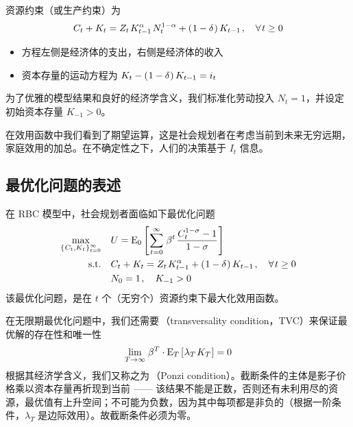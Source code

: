 
资源约束（或生产约束）为
\begin{align}
    C_t+K_t=Z_t\,K\lt^\alpha\,N_t^{1-\alpha}+\bka{1-\delta}K_{t-1}\,, \quad \forall\,t\geq 0
\end{align}
\begin{itemize}
    \item 方程左侧是经济体的支出，右侧是经济体的收入
    \item 资本存量的运动方程为 \(K_t-\left(\mspace{1mu}1-\delta\mspace{1mu}\right)K_{t-1}=i_t\)
\end{itemize}


为了优雅的模型结果和良好的经济学含义，我们标准化劳动投入 \(N_t=1\)，并设定初始资本存量 \(K_{-1}>0\)。


在效用函数中我们看到了期望运算，这是社会规划者在考虑当前到未来无穷远期，家庭效用的加总。在不确定性之下，人们的决策基于 \(I_t\) 信息。


\subsection{最优化问题的表述}\label{subsec:OptProbForm}

在 RBC 模型中，社会规划者面临如下最优化问题
\begin{align*}
    \max_{\bkd{C_t,K_t}\wsito} \quad & U= \mean_0\bks{\sum\wsito \,\beta^t\,\dfrac{C_t^{1-\sigma}-1}{1-\sigma}} \\
    \text{s.t.} \quad & C_t+K_t=Z_t\,K^\alpha\lt+\bka{1-\delta}K_{t-1}\,, \quad \forall\, t\geq 0 \\
    & N_0=1\,,\quad K_{-1}>0
\end{align*}
该最优化问题，是在 \(t\) 个（无穷个）资源约束下最大化效用函数。

在无限期最优化问题中，我们还需要\,（transversality condition，TVC）来保证最优解的存在性和唯一性
\begin{align}
    \lim_{T\to\infty}\,\beta^T\cdot\mean_T\bks{\lambda_T\,K_T}=0
\end{align}
根据其经济学含义，我们又称之为\,（Ponzi condition）。截断条件的主体是影子价格乘以资本存量再折现到当前 —— 该结果不能是正数，否则还有未利用尽的资源，最优值有上升空间；不可能为负数，因为其中每项都是非负的（根据一阶条件，\(\lambda_T\) 是边际效用）。故截断条件必须为零。

